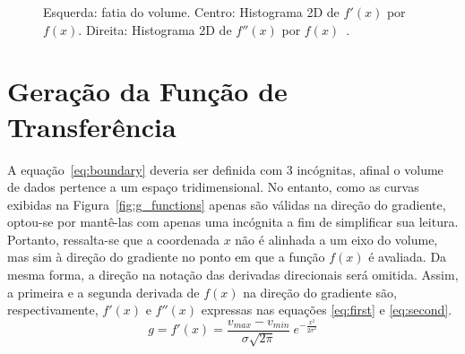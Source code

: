 \begin{figure}[b]
	\centering
	\caption{Esquerda: fatia do volume. Centro: Histograma 2D de $ f'(x) $ por $ f(x) $. Direita: Histograma 2D de $ f''(x) $ por $ f(x) $~\cite{gordon}.}
	\label{fig:g_res}
\end{figure}
    
\section{Geração da Função de Transferência}
\label{gordon.ft}
	A equação~\eqref{eq:boundary} deveria ser definida com 3 incógnitas, afinal o volume de dados pertence a um espaço tridimensional. No entanto, como as curvas exibidas na Figura~\ref{fig:g_functions} apenas são válidas na direção do gradiente, optou-se por mantê-las com apenas uma incógnita a fim de simplificar sua leitura. Portanto, ressalta-se que a coordenada $x$ não é alinhada a um eixo do volume, mas sim à direção do gradiente no ponto em que a função $f(x)$ é avaliada. Da mesma forma, a direção na notação das derivadas direcionais será omitida. Assim, a primeira e a segunda derivada de $f(x)$ na direção do gradiente são, respectivamente, $f'(x)$ e $f''(x)$ expressas nas equações \eqref{eq:first} e \eqref{eq:second}. \\
	
\begin{equation} \label{eq:first}
	g = f'(x) = \frac{v_{max} - v_{min}}{\sigma\sqrt{2\pi}}\ e^{-\frac{x^{2}}{2\sigma^{2}}}
\end{equation} \\

